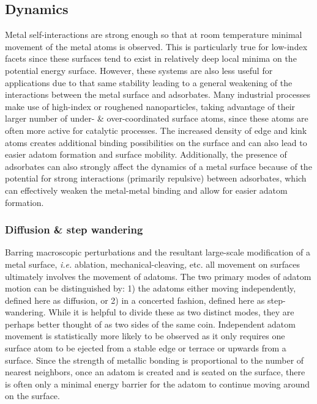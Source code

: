 \subsection{Dynamics}
Metal self-interactions are strong enough so that at room temperature minimal
movement of the metal atoms is observed. This is particularly true for
low-index facets since these surfaces tend to exist in relatively deep local
minima on the potential energy surface. However, these systems are also less
useful for applications due to that same stability leading to a general
weakening of the interactions between the metal surface and adsorbates.  Many
industrial processes make use of high-index or roughened nanoparticles, taking
advantage of their larger number of under- \& over-coordinated surface atoms,
since these atoms are often more active for catalytic
processes.\citep{Stephens:2011bv, Calle-Vallejo:2015qq} The increased density
of edge and kink atoms creates additional binding possibilities on the surface
and can also lead to easier adatom formation and surface mobility.
Additionally, the presence of adsorbates can also strongly affect the dynamics
of a metal surface because of the potential for strong interactions (primarily
repulsive) between adsorbates, which can effectively weaken the metal-metal
binding and allow for easier adatom formation.\citep{Tao:2010aa, Eren:2016qt}


\subsubsection{Diffusion \& step wandering}
Barring macroscopic perturbations and the resultant large-scale modification of
a metal surface, {\em i.e.} ablation, mechanical-cleaving, etc. all movement on
surfaces ultimately involves the movement of adatoms. The two primary modes of
adatom motion can be distinguished by: 1) the adatoms either moving
independently, defined here as diffusion, or 2) in a concerted fashion, defined
here as step-wandering. While it is helpful to divide these as two distinct
modes, they are perhaps better thought of as two sides of the same coin.
Independent adatom movement is statistically more likely to be observed as it
only requires one surface atom to be ejected from a stable edge or terrace or
upwards from a surface.  Since the strength of metallic bonding is proportional
to the number of nearest neighbors, once an adatom is created and is seated on
the surface, there is often only a minimal energy barrier for the adatom to
continue moving around on the surface.

